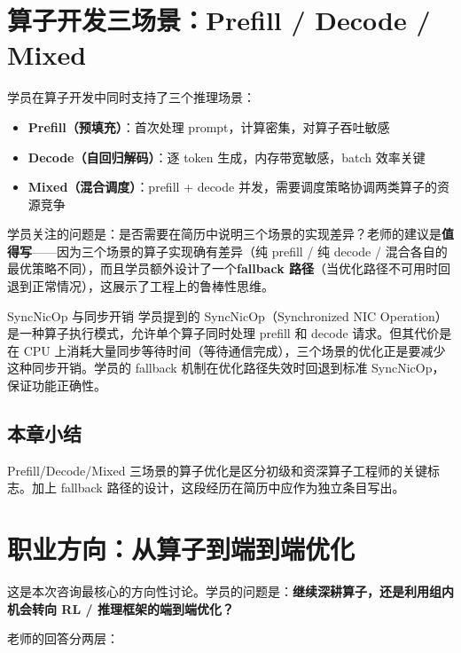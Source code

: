 \documentclass[a4paper]{article}
\begin{document}
\section{算子开发三场景：Prefill / Decode / Mixed}

学员在算子开发中同时支持了三个推理场景：

\begin{itemize}
\item \textbf{Prefill（预填充）}：首次处理 prompt，计算密集，对算子吞吐敏感
\item \textbf{Decode（自回归解码）}：逐 token 生成，内存带宽敏感，batch 效率关键
\item \textbf{Mixed（混合调度）}：prefill + decode 并发，需要调度策略协调两类算子的资源竞争
\end{itemize}

学员关注的问题是：是否需要在简历中说明三个场景的实现差异？老师的建议是\textbf{值得写}——因为三个场景的算子实现确有差异（纯 prefill / 纯 decode / 混合各自的最优策略不同），而且学员额外设计了一个\textbf{fallback 路径}（当优化路径不可用时回退到正常情况），这展示了工程上的鲁棒性思维。

\begin{knowledgebox}{SyncNicOp 与同步开销}
学员提到的 SyncNicOp（Synchronized NIC Operation）是一种算子执行模式，允许单个算子同时处理 prefill 和 decode 请求。但其代价是在 CPU 上消耗大量同步等待时间（等待通信完成），三个场景的优化正是要减少这种同步开销。学员的 fallback 机制在优化路径失效时回退到标准 SyncNicOp，保证功能正确性。
\end{knowledgebox}

\subsection{本章小结}
Prefill/Decode/Mixed 三场景的算子优化是区分初级和资深算子工程师的关键标志。加上 fallback 路径的设计，这段经历在简历中应作为独立条目写出。

\clearpage

\section{职业方向：从算子到端到端优化}

这是本次咨询最核心的方向性讨论。学员的问题是：\textbf{继续深耕算子，还是利用组内机会转向 RL / 推理框架的端到端优化？}

老师的回答分两层：
\end{document}
